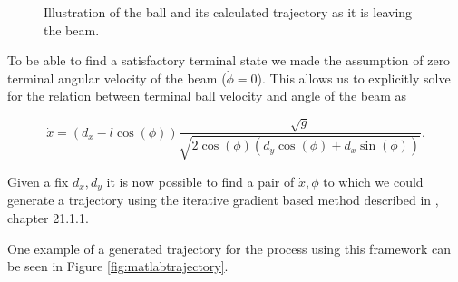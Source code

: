 \begin{figure}[\textwidth]
\centering

\caption{Illustration of the ball and its calculated trajectory as it is leaving the beam.}
\label{fig:throw}
\end{figure}
%
%


To be able to find a satisfactory terminal state we made the assumption of zero terminal angular velocity of the beam ($\dot{\phi}=0$). This allows us to explicitly solve for the relation between terminal ball velocity and angle of the beam as

%
%
%
%
%
\[
\dot{x}=\left(d_{x}-l\cos(\phi)\right)\frac{\sqrt{g}}{\sqrt{2\cos(\phi)\left(d_{y}\cos(\phi)+d_{x}\sin(\phi)\right)}}.
\]

Given a fix $d_x,d_y$ it is now possible to find a pair of $\dot x,\phi$ to which we could generate a trajectory using the iterative gradient based method described in \cite{NR}, chapter 21.1.1.

One example of a generated trajectory for the process using this framework can be seen in Figure \ref{fig:matlabtrajectory}.

